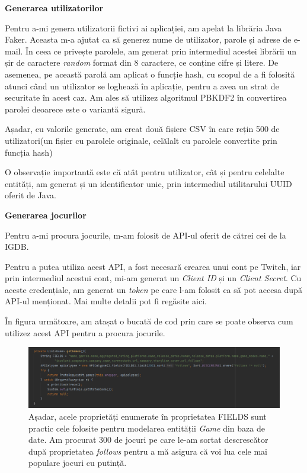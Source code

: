\documentclass[12pt,a4paper]{report}
\begin{document}
\bigskip
\textbf{Generarea utilizatorilor}
\bigskip

Pentru a-mi genera utilizatorii fictivi ai aplicației, am apelat la librăria Java Faker. Aceasta m-a ajutat ca să generez nume de utilizator, parole și adrese de e-mail. În ceea ce privește parolele, am generat prin intermediul acestei librării un șir de caractere \emph{random} format din 8 caractere, ce conține cifre și litere. De asemenea, pe această parolă am aplicat o funcție hash, cu scopul de a fi folosită atunci când un utilizator se loghează în aplicație, pentru a avea un strat de securitate în acest caz. Am ales să utilizez algoritmul PBKDF2 în convertirea parolei deoarece este o variantă sigură. \cite{15}

Așadar, cu valorile generate, am creat două fișiere CSV în care rețin 500 de utilizatori(un fișier cu parolele originale, celălalt cu parolele convertite prin funcția hash)

O observație importantă este că atât pentru utilizator, cât și pentru celelalte entități, am generat și un identificator unic, prin intermediul utilitarului UUID oferit de Java.

\bigskip
\textbf{Generarea jocurilor}
\bigskip

Pentru a-mi procura jocurile, m-am folosit de API-ul oferit de cătrei cei de la IGDB.

Pentru a putea utiliza acest API, a fost necesară crearea unui cont pe Twitch, iar prin intermediul acestui cont, mi-am generat un \emph{Client ID} și un \emph{Client Secret}. Cu aceste credențiale, am generat un \emph{token} pe care l-am folosit ca să pot accesa după API-ul menționat. Mai multe detalii pot fi regăsite aici. \cite{16}

În figura următoare, am atașat o bucată de cod prin care se poate observa cum utilizez acest API pentru a procura jocurile.

\begin{figure}[H]
\centering
\caption{}
\includegraphics[scale = 0.6]{exemplu_10_games}
\caption*{Așadar, acele proprietăți enumerate în proprietatea FIELDS sunt practic cele folosite pentru modelarea entității \emph{Game} din baza de date. Am procurat 300 de jocuri pe care le-am sortat descrescător după proprietatea \emph{follows} pentru a mă asigura că voi lua cele mai populare jocuri cu putință. }
\end{figure}
\end{document}

